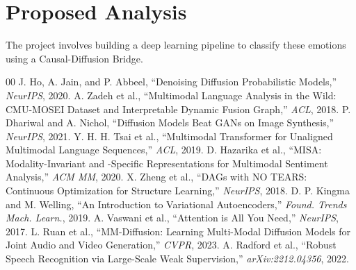\documentclass[conference]{IEEEtran}
\begin{document}
\section{Proposed Analysis}
The project involves building a deep learning pipeline to classify these emotions using a Causal-Diffusion Bridge.

\begin{thebibliography}{00}
 J. Ho, A. Jain, and P. Abbeel, ``Denoising Diffusion Probabilistic Models,'' \textit{NeurIPS}, 2020.
 A. Zadeh et al., ``Multimodal Language Analysis in the Wild: CMU-MOSEI Dataset and Interpretable Dynamic Fusion Graph,'' \textit{ACL}, 2018.
 P. Dhariwal and A. Nichol, ``Diffusion Models Beat GANs on Image Synthesis,'' \textit{NeurIPS}, 2021.
 Y. H. H. Tsai et al., ``Multimodal Transformer for Unaligned Multimodal Language Sequences,'' \textit{ACL}, 2019.
 D. Hazarika et al., ``MISA: Modality-Invariant and -Specific Representations for Multimodal Sentiment Analysis,'' \textit{ACM MM}, 2020.
 X. Zheng et al., ``DAGs with NO TEARS: Continuous Optimization for Structure Learning,'' \textit{NeurIPS}, 2018.
 D. P. Kingma and M. Welling, ``An Introduction to Variational Autoencoders,'' \textit{Found. Trends Mach. Learn.}, 2019.
 A. Vaswani et al., ``Attention is All You Need,'' \textit{NeurIPS}, 2017.
 L. Ruan et al., ``MM-Diffusion: Learning Multi-Modal Diffusion Models for Joint Audio and Video Generation,'' \textit{CVPR}, 2023.
 A. Radford et al., ``Robust Speech Recognition via Large-Scale Weak Supervision,'' \textit{arXiv:2212.04356}, 2022.
\end{thebibliography}
\end{document}
